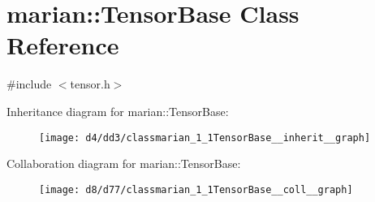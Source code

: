 \hypertarget{classmarian_1_1TensorBase}{}\section{marian\+:\+:Tensor\+Base Class Reference}
\label{classmarian_1_1TensorBase}


{\ttfamily \#include $<$tensor.\+h$>$}



Inheritance diagram for marian\+:\+:Tensor\+Base\+:
\nopagebreak
\begin{figure}[H]
\begin{center}
\leavevmode
\texttt{[image: d4/dd3/classmarian\_1\_1TensorBase\_\_inherit\_\_graph]}
\end{center}
\end{figure}


Collaboration diagram for marian\+:\+:Tensor\+Base\+:
\nopagebreak
\begin{figure}[H]
\begin{center}
\leavevmode
\texttt{[image: d8/d77/classmarian\_1\_1TensorBase\_\_coll\_\_graph]}
\end{center}
\end{figure}

